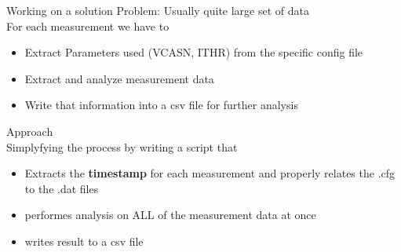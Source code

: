 \begin{frame}{Working on a solution}
    \Large{Problem: Usually quite large set of data}\\
    \normalsize
    For each measurement we have to
    \begin{itemize}
	\item Extract Parameters used (VCASN, ITHR) from the specific config
	    file
	    \pause
	\item Extract and analyze measurement data
	    \pause
	\item Write that information into a csv file for further analysis
	    \pause
    \end{itemize}
    \Large{Approach}\\
    \normalsize
    Simplyfying the process by writing a script that
    \begin{itemize}
	\item Extracts the \textbf{timestamp} for each measurement and properly
	    relates the .cfg to the .dat files
	    \pause
	\item performes analysis on ALL of the measurement data at once
	    \pause
	\item writes result to a csv file
    \end{itemize}
\end{frame}

